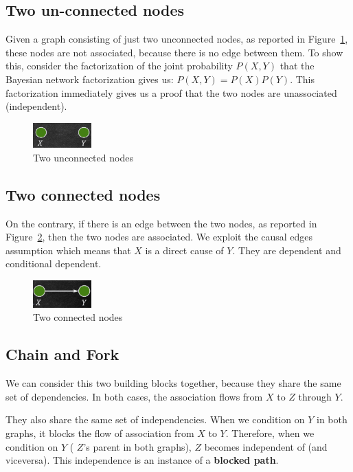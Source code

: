 \subsection{Two un-connected nodes}
Given a graph consisting of just two unconnected nodes, as reported in Figure~\ref{fig:two_unconnected_nodes},
these nodes are not associated, because there is no edge between them. To show
this, consider the factorization of the joint probability $P(X, Y)$ that the
Bayesian network factorization gives us: $P(X, Y) = P(X)P(Y)$. This factorization
immediately gives us a proof that the two nodes are unassociated (independent).

\begin{figure}[!ht]
    \centering
    \includegraphics[width=0.2\textwidth]{img/flow/two_unconnected_nodes.png}
    \caption{Two unconnected nodes}
    \label{fig:two_unconnected_nodes}
\end{figure}
\subsection{Two connected nodes}
On the contrary, if there is an edge between the two nodes, as reported in Figure~\ref{fig:two_connected_nodes},
then the two nodes are associated. We exploit the causal edges assumption which
means that $X$ is a direct cause of $Y$. They are dependent and conditional dependent.

\begin{figure}[!ht]
    \centering
    \includegraphics[width=0.2\textwidth]{img/flow/two_connected_nodes.png}
    \caption{Two connected nodes}
    \label{fig:two_connected_nodes}
\end{figure}

\subsection{Chain and Fork}
We can consider this two building blocks together, because they share the same
set of dependencies. In both cases, the association flows from $X$ to $Z$ through
$Y$.

They also share the same set of independencies. When we condition on $Y$ in both
graphs, it blocks the flow of association from $X$ to $Y$. Therefore, when we
condition on $Y$ ( $Z$'s parent in both graphs), $Z$ becomes independent of (and
viceversa). This independence is an instance of a \textbf{blocked path}.

